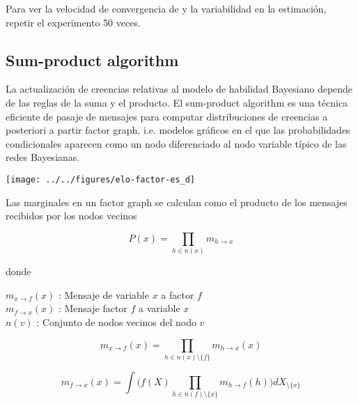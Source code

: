 \documentclass[a4paper,10pt]{article}
\begin{document}
Para ver la velocidad de convergencia de y la variabilidad en la estimaci\'on, repetir el experimento 50 veces.

\subsection{Sum-product algorithm}\label{ssec:sum_product}

La actualizaci\'on de creencias relativas al modelo de habilidad Bayesiano depende de las reglas de la suma y el producto.
El sum-product algorithm es una t\'ecnica eficiente de pasaje de mensajes para computar distribuciones de creencias a posteriori a partir factor graph, i.e. modelos gr\'aficos en el que las probabilidades condicionales aparecen como un nodo diferenciado al nodo variable t\'ipico de las redes Bayesianas.

\vspace{0.3cm}

\begin{paracol}{2}
\texttt{[image: ../../figures/elo-factor-es\_d]}     

\switchcolumn

\vspace{0.25cm}

Las marginales en un factor graph se calculan como el producto de los mensajes recibidos por los nodos vecinos

\begin{equation*}
P(x) = \prod_{h \in n(x)} m_{h \rightarrow x} 
\end{equation*} 

donde

\begin{center}
$m_{x \rightarrow f}(x)$ : Mensaje de variable $x$ a factor $f$ \\[0.2cm]
 $m_{f \rightarrow x}(x)$ : Mensaje factor $f$ a variable $x$\\[0.2cm]
 $n(v)$ : Conjunto de nodos vecinos del nodo $v$
\end{center}


\begin{equation*}
m_{x \rightarrow f}(x) = \prod_{h \in n(x) \setminus \{f\} } m_{h \rightarrow x}(x) 
\end{equation*}

\begin{equation*}
 m_{f \rightarrow x}(x) = \int \Big( f(X) \prod_{h \in n(f) \setminus \{x\} } m_{h \rightarrow f}(h) \Big) dX_{\setminus \{x\}}
\end{equation*}


 \end{paracol}
\end{document}
